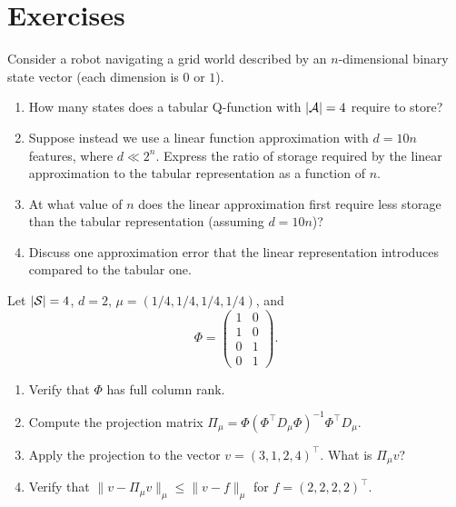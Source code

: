 \section*{Exercises}
\label{sec:exercises-vfa}

\begin{exercise}
\label{ex:curse-dimensionality}
Consider a robot navigating a grid world described by an $n$-dimensional binary state vector (each
dimension is $0$ or $1$).
\begin{enumerate}
\item How many states does a tabular Q-function with $|\mathcal{A}| = 4$ require to store?
\item Suppose instead we use a linear function approximation with $d = 10n$ features, where $d \ll 2^n$.
  Express the ratio of storage required by the linear approximation to the tabular representation
  as a function of $n$.
\item At what value of $n$ does the linear approximation first require less storage than the tabular
  representation (assuming $d = 10n$)?
\item Discuss one approximation error that the linear representation introduces compared to the tabular one.
\end{enumerate}
\end{exercise}

\begin{exercise}
\label{ex:projection-compute}
Let $|\mathcal{S}| = 4$, $d = 2$, $\mu = (1/4, 1/4, 1/4, 1/4)$, and
\[
\Phi = \begin{pmatrix} 1 & 0 \\ 1 & 0 \\ 0 & 1 \\ 0 & 1 \end{pmatrix}.
\]
\begin{enumerate}
\item Verify that $\Phi$ has full column rank.
\item Compute the projection matrix $\Pi_\mu = \Phi(\Phi^\top D_\mu \Phi)^{-1} \Phi^\top D_\mu$.
\item Apply the projection to the vector $v = (3, 1, 2, 4)^\top$.  What is $\Pi_\mu v$?
\item Verify that $\|v - \Pi_\mu v\|_\mu \leq \|v - f\|_\mu$ for $f = (2, 2, 2, 2)^\top$.
\end{enumerate}
\end{exercise}


